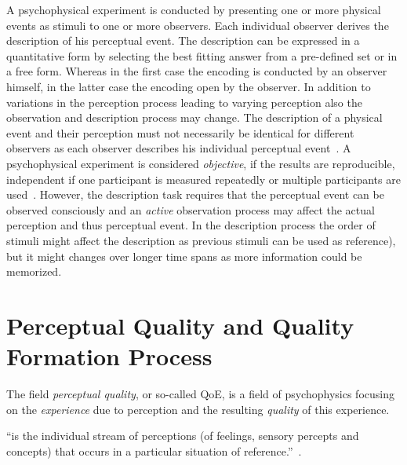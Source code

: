 A psychophysical experiment is conducted by presenting one or more physical events as stimuli to one or more observers.
Each individual observer derives the description of his perceptual event.
The description can be expressed in a quantitative form by selecting the best fitting answer from a pre-defined set or in a free form.
Whereas in the first case the encoding is conducted by an observer himself, in the latter case the encoding open by the observer.
In addition to variations in the perception process leading to varying perception also the observation and description process may change.
The description of a physical event and their perception must not necessarily be identical for different observers as each observer describes his individual perceptual event~\citep[p. 11]{blauert_spatial_1996}.
A psychophysical experiment is considered \emph{objective}, if the results are reproducible, independent if one participant is measured repeatedly or multiple participants are used~\citep[p. 11]{blauert_spatial_1996}.
However, the description task requires that the perceptual event can be observed consciously and an \emph{active} observation process may affect the actual perception and thus perceptual event.
In the description process the order of stimuli might affect the description as previous stimuli can be used as reference), but it might changes over longer time spans as more information could be memorized.

\section{Perceptual Quality and Quality Formation Process}
The field \emph{perceptual quality}, or so-called \ac{QoE}, is a field of psychophysics focusing on the \emph{experience} due to perception and the resulting \emph{quality} of this experience.
\begin{definition}[Experiencing]
``is the individual stream of perceptions (of feelings, sensory percepts and concepts) that occurs in a particular situation of reference.''~\citep[p. 13]{moller_quality_2014}.
\end{definition}

